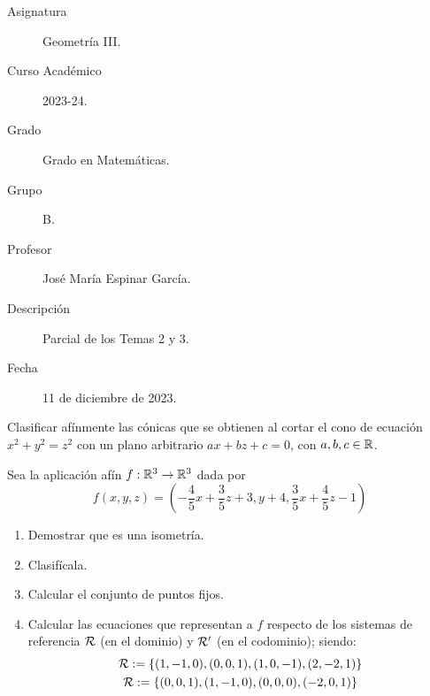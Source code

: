 \documentclass[12pt]{article}
\begin{document}

    
    

    \begin{description}
        \item[Asignatura] Geometría III.
        \item[Curso Académico] 2023-24.
        \item[Grado] Grado en Matemáticas.
        \item[Grupo] B.
        \item[Profesor] José María Espinar García.
        \item[Descripción] Parcial de los Temas 2 y 3.
        \item[Fecha] 11 de diciembre de 2023.
    
    \end{description}
    \newpage
    
    \begin{ejercicio}[3 puntos]
        Clasificar afínmente las cónicas que se obtienen al cortar el cono de ecuación $x^2+y^2=z^2$ con un plano arbitrario  $ax+bz+c=0$, con $a,b,c\in \mathbb{R}$.
    \end{ejercicio}

    \begin{ejercicio}[4 puntos]
        Sea la aplicación afín $f:\mathbb{R}^3\to \mathbb{R}^3$ dada por
        \begin{equation*}
            f(x,y,z)=\left(-\frac{4}{5}x + \frac{3}{5}z + 3, y+4,\frac{3}{5}x + \frac{4}{5}z-1\right)
        \end{equation*}
        \begin{enumerate}
            \item Demostrar que es una isometría.
            \item Clasifícala.
            \item Calcular el conjunto de puntos fijos.
            \item Calcular las ecuaciones que representan a $f$ respecto de los sistemas de referencia $\mathcal{R}$ (en el dominio) y $\mathcal{R}'$ (en el codominio); siendo:
            \begin{gather*}
                \mathcal{R}:=\{(1,-1,0), (0,0,1), (1,0,-1), (2,-2,1)\}\\
                \mathcal{R}:=\{(0,0,1), (1,-1,0), (0,0,0), (-2,0,1)\}
            \end{gather*}
        \end{enumerate}
    \end{ejercicio}
\end{document}
